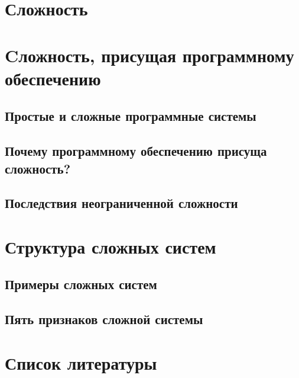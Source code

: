 \documentclass{article}
\begin{document}
    \section*{Сложность}
    \section{Cложность, присущая программному обеспечению }
    	\subsection{Простые и сложные программные системы }
    	\subsection{Почему программному обеспечению присуща сложность? }
    	\subsection{Последствия неограниченной сложности }
    \section{Структура сложных систем}
    	\subsection{Примеры сложных систем }
    	\subsection{Пять признаков сложной системы }
    \section*{Список литературы}
    
    
\end{document}
